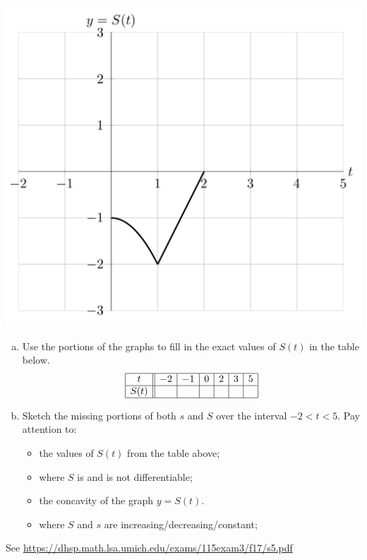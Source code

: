 \documentclass[11pt]{exam}
\begin{document}
\begin{questions}
\begin{multicols}{2}
	\includegraphics[scale=0.39]{Sgraph}
	\end{multicols}
	\begin{enumerate}[(a)]
		\item Use the portions of the graphs to fill in the exact values of $S(t)$ in the table below.
		$$\begin{array}{|c||c|c|c|c|c|c|c|}
	\hline
	t & -2 & -1 & 0 & 2 & 3 & 5 \\
	\hline
	S(t) & & & & & & \\
	\hline
	\end{array}$$
      \item Sketch the missing portions of both $s$ and $S$ over the interval $-2 < t < 5$. Pay attention to:
\begin{itemize}
\item the values of $S(t)$ from the table above;
\item where $S$ is and is not differentiable;
\item the concavity of the graph $y = S(t)$.
\item where $S$ and $s$ are increasing/decreasing/constant;
\end{itemize}
\end{enumerate}
\begin{solution}
See \href{https://dhsp.math.lsa.umich.edu/exams/115exam3/f17/s5.pdf}{https://dhsp.math.lsa.umich.edu/exams/115exam3/f17/s5.pdf}
\end{solution}

\end{questions}
\end{document}
